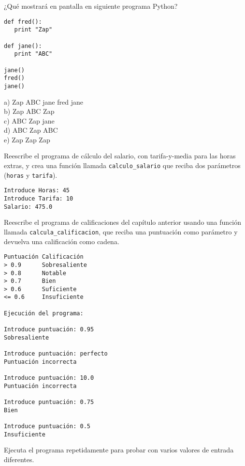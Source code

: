 \begin{ex}
¿Qué mostrará en pantalla en siguiente programa Python?

\beforeverb
\begin{verbatim}
def fred():
   print "Zap"

def jane():
   print "ABC"

jane()
fred()
jane()
\end{verbatim}
\afterverb
%
a) Zap ABC jane fred jane\\
b) Zap ABC Zap\\
c) ABC Zap jane\\
d) ABC Zap ABC\\
e) Zap Zap Zap
\end{ex}

\begin{ex}
Reescribe el programa de cálculo del salario, con tarifa-y-media para las horas extras,
y crea una función llamada \verb"calculo_salario" que reciba
dos parámetros ({\tt horas} y {\tt tarifa}).

\begin{verbatim}
Introduce Horas: 45
Introduce Tarifa: 10
Salario: 475.0
\end{verbatim}
\end{ex}

\begin{ex}
Reescribe el programa de calificaciones del capítulo anterior
usando una función llamada \verb"calcula_calificacion", que reciba
una puntuación como parámetro y devuelva una calificación como cadena.

\begin{verbatim}
Puntuación Calificación
> 0.9      Sobresaliente
> 0.8      Notable
> 0.7      Bien
> 0.6      Suficiente
<= 0.6     Insuficiente

Ejecución del programa:

Introduce puntuación: 0.95
Sobresaliente

Introduce puntuación: perfecto
Puntuación incorrecta

Introduce puntuación: 10.0
Puntuación incorrecta

Introduce puntuación: 0.75
Bien

Introduce puntuación: 0.5
Insuficiente
\end{verbatim}

Ejecuta el programa repetidamente para probar con varios valores
de entrada diferentes.
\end{ex}